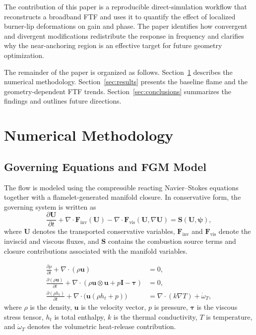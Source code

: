 \documentclass{iopconfser}
\begin{document}
The contribution of this paper is a reproducible direct-simulation workflow that reconstructs a broadband FTF and uses it to quantify the effect of localized burner-lip deformations on gain and phase. The paper identifies how convergent and divergent modifications redistribute the response in frequency and clarifies why the near-anchoring region is an effective target for future geometry optimization.

The remainder of the paper is organized as follows. Section~\ref{sec:methodology} describes the numerical methodology. Section~\ref{sec:results} presents the baseline flame and the geometry-dependent FTF trends. Section~\ref{sec:conclusions} summarizes the findings and outlines future directions.

\section{Numerical Methodology}
\label{sec:methodology}

\subsection{Governing Equations and FGM Model}
\label{subsec:fgm}

The flow is modeled using the compressible reacting Navier--Stokes equations together with a flamelet-generated manifold closure. In conservative form, the governing system is written as
\begin{equation}
  \frac{\partial \mathbf{U}}{\partial t}
  + \nabla \cdot \mathbf{F}_{\mathrm{inv}}(\mathbf{U})
  - \nabla \cdot \mathbf{F}_{\mathrm{vis}}(\mathbf{U},\nabla \mathbf{U})
  = \mathbf{S}(\mathbf{U},\boldsymbol{\psi}),
  \label{eq:governing-equations}
\end{equation}
where $\mathbf{U}$ denotes the transported conservative variables, $\mathbf{F}_{\mathrm{inv}}$ and $\mathbf{F}_{\mathrm{vis}}$ denote the inviscid and viscous fluxes, and $\mathbf{S}$ contains the combustion source terms and closure contributions associated with the manifold variables.

\begin{align}
  \frac{\partial \rho}{\partial t} + \nabla \cdot (\rho \mathbf{u}) &= 0, \label{eq:continuity}\\
  \frac{\partial (\rho \mathbf{u})}{\partial t} + \nabla \cdot (\rho \mathbf{u}\otimes\mathbf{u} + p\mathbf{I} - \boldsymbol{\tau}) &= 0, \label{eq:momentum}\\
  \frac{\partial (\rho h_t)}{\partial t} + \nabla \cdot \bigl(\mathbf{u}(\rho h_t + p)\bigr) &= \nabla \cdot (k \nabla T) + \dot{\omega}_T, \label{eq:energy}
\end{align}
where $\rho$ is the density, $\mathbf{u}$ is the velocity vector, $p$ is pressure, $\boldsymbol{\tau}$ is the viscous stress tensor, $h_t$ is total enthalpy, $k$ is the thermal conductivity, $T$ is temperature, and $\dot{\omega}_T$ denotes the volumetric heat-release contribution.
\end{document}
